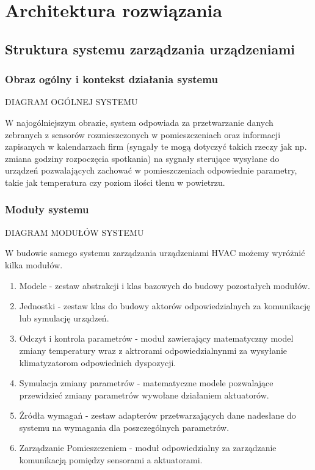 \chapter{Architektura rozwiązania}
\section{Struktura systemu zarządzania urządzeniami}
\subsection{Obraz ogólny i kontekst działania systemu}
DIAGRAM OGÓLNEJ SYSTEMU
% 

W najogólniejszym obrazie, system odpowiada za przetwarzanie danych zebranych z sensorów rozmieszczonych w pomieszczeniach oraz informacji zapisanych w kalendarzach firm (syngały te mogą dotyczyć takich rzeczy jak np. zmiana godziny rozpoczęcia spotkania) na sygnały sterujące wysyłane do urządzeń pozwalających zachować w pomieszczeniach odpowiednie parametry, takie jak temperatura czy poziom ilości tlenu w powietrzu.

\subsection{Moduły systemu}
DIAGRAM MODUŁÓW SYSTEMU
% 

W budowie samego systemu zarządzania urządzeniami HVAC możemy wyróżnić kilka modułów.
\begin{enumerate}
    \item Modele - zestaw abstrakcji i klas bazowych do budowy pozostałych modułów.  
    \item Jednostki - zestaw klas do budowy aktorów odpowiedzialnych za komunikację lub symulację urządzeń.
    \item Odczyt i kontrola parametrów - moduł zawierający matematyczny model zmiany temperatury wraz z aktrorami odpowiedzialnynmi za wysyłanie klimatyzatorom odpowiednich dyspozycji.
    \item Symulacja zmiany parametrów - matematyczne modele pozwalające przewidzieć zmiany parametrów wywołane działaniem aktuatorów.
    \item Źródła wymagań - zestaw adapterów przetwarzających dane nadesłane do systemu na wymagania dla poszczególnych parametrów. 
    \item Zarządzanie Pomieszczeniem - moduł odpowiedzialny za zarządzanie komunikacją pomiędzy sensorami a aktuatorami. 
\end{enumerate}

